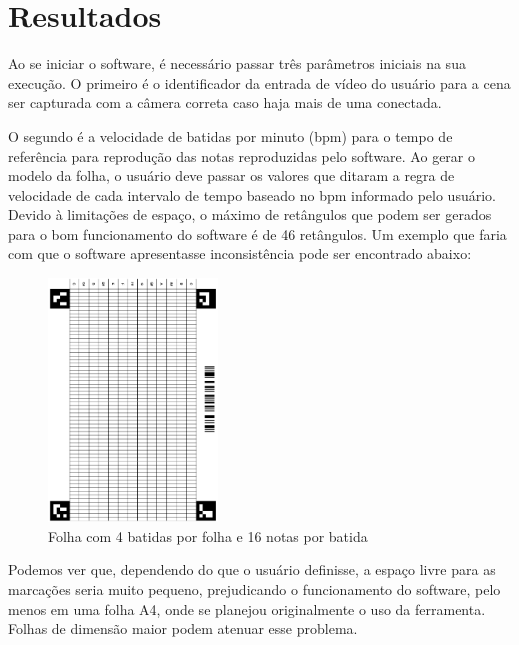 \documentclass[12pt]{report}
\begin{document}

\chapter{Resultados}
\label{cha:results}

Ao se iniciar o software, é necessário passar três parâmetros iniciais
na sua execução. O primeiro é o identificador da entrada de vídeo do
usuário para a cena ser capturada com a câmera correta caso haja mais
de uma conectada.

O segundo é a velocidade de batidas por minuto (bpm) para o tempo de
referência para reprodução das notas reproduzidas pelo software. Ao
gerar o modelo da folha, o usuário deve passar os valores que ditaram
a regra de velocidade de cada intervalo de tempo baseado no bpm
informado pelo usuário. Devido à limitações de espaço, o máximo de
retângulos que podem ser gerados para o bom funcionamento do software
é de 46 retângulos. Um exemplo que faria com que o software
apresentasse inconsistência pode ser encontrado abaixo:

\begin{figure}[H]
  \centering
    \includegraphics[angle=90,origin=c,width=0.4\textwidth]{imagens/416.png}
    \caption{Folha com 4 batidas por folha e 16 notas por batida}
  \label{fig:416}
\end{figure}

Podemos ver que, dependendo do que o usuário definisse, a espaço livre
para as marcações seria muito pequeno, prejudicando o funcionamento do
software, pelo menos em uma folha A4, onde se planejou originalmente o
uso da ferramenta. Folhas de dimensão maior podem atenuar esse
problema.
\end{document}

